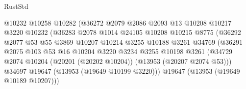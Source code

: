 \begin{lexlean}{RustStd}
\begin{coremodule}
                                      @10232
                                      @10258
                                      @10282
                                      (@36272
                                        @2079
                                        @2086
                                        @2093
                                        @13
                                        @10208
                                        @10217
                                        @3220
                                        @10232
                                        (@36283
                                          @2078
                                          @1014
                                          @24105
                                          @10208
                                          @10215
                                          @8775
                                          (@36292
                                            @2077
                                            @53
                                            @55
                                            @3869
                                            @10207
                                            @10214
                                            @3255
                                            @10188
                                            @3261
                                            @34769
                                            (@36291
                                              @2075
                                              @103
                                              @53
                                              @16
                                              @10204
                                              @3220
                                              @3234
                                              @3255
                                              @10198
                                              @3261
                                              (@34729
                                                @2074
                                                @10204
                                                (@20201 (@20202 @10204))
                                                (@13953 (@20207 @2074 @53)))
                                              @34697
                                              @19647
                                              (@13953 (@19649 @10199 @3220)))
                                            @19647
                                            (@13953 (@19649 @10189 @10207)))

\end{coremodule}
\end{lexlean}

